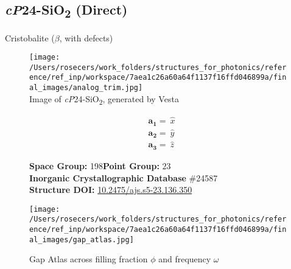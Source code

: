 \subsection{\large{\textit{cP}24-SiO\textsubscript{2} (Direct)}}\vspace{-0.1in}
Cristobalite ($\beta$, with defects)


\begin{figure}[H]
\begin{minipage}{0.34\textwidth}\centering
\texttt{[image: /Users/rosecers/work\_folders/structures\_for\_photonics/reference/ref\_inp/workspace/7aea1c26a60a64f1137f16ffd046899a/final\_images/analog\_trim.jpg]}\\
\small{Image of \textit{cP}24-SiO\textsubscript{2}, generated by Vesta}
\end{minipage}\hfill
\begin{minipage}{0.65\textwidth}\raggedright
{\setlength{\mathindent}{0cm}
\begin{equation*}
\begin{split}&\boldsymbol{a_1} = \ \hat{x}\\[-8pt]
&\boldsymbol{a_2} = \ \hat{y}\\[-8pt]
&\boldsymbol{a_3} = \ \hat{z}
\end{split}
\end{equation*}}

\textbf{Space Group:}	198\hspace{0.5in}\textbf{Point Group:}	$23$\\
\textbf{Inorganic Crystallographic Database} \#24587\\
\textbf{Structure DOI: }\url{10.2475/ajs.s5-23.136.350}

\end{minipage}\hfill
\end{figure}
\vspace{-0.25in}


\begin{figure}[H]
\begin{minipage}{0.9\textwidth}\centering
\texttt{[image: /Users/rosecers/work\_folders/structures\_for\_photonics/reference/ref\_inp/workspace/7aea1c26a60a64f1137f16ffd046899a/final\_images/gap\_atlas.jpg]}
\\
\end{minipage}\hfill\caption{Gap Atlas across filling fraction $\phi$ and frequency $\omega$}
\end{figure}


